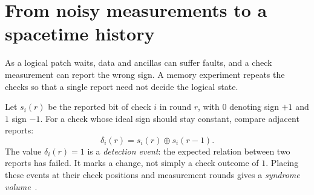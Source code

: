 \documentclass[11pt,a4paper]{article}
\newcommand{\ZL}{\overline Z}
\begin{document}
\begin{center}
\label{fig:program}
\end{center}


\section{From noisy measurements to a spacetime history}\label{sec:volume}
As a logical patch waits, data and ancillas can suffer faults, and a check measurement can report the wrong sign. A memory experiment repeats the checks so that a single report need not decide the logical state.

Let $s_i(r)$ be the reported bit of check $i$ in round $r$, with $0$ denoting sign $+1$ and $1$ sign $-1$. For a check whose ideal sign should stay constant, compare adjacent reports:
\begin{equation}\label{eq:detector}
\delta_i(r)=s_i(r)\oplus s_i(r-1).
\end{equation}
 The value $\delta_i(r)=1$ is a \emph{detection event}: the expected relation between two reports has failed. It marks a change, not simply a check outcome of $1$. Placing these events at their check positions and measurement rounds gives a \emph{syndrome volume}~\cite{dennis,stim}.
\end{document}
